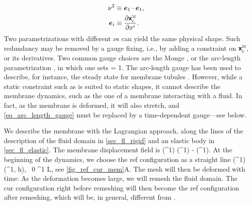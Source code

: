 \begin{align}\label{eq_intro_nu}
    \nu ^ 2   & \equiv \bevec{1}   \cdot \bevec{1}, \\
    \label{eq_def_e}
    \bevec{i} & \equiv \pder{{\bxmemc}}{\xcoord^i}.
\end{align}
Two  parametrizations with different $\nu$s can yield the same physical shape. Such  redundancy  may be removed by a gauge fixing, i.e., by adding a constraint on $\bxmemc$, or its derivatives.
Two common gauge choices are the Monge  \cite{hsiungFirstCourseDifferential1981,desernoFluidLipidMembranes2015}, or the arc-length parametrization \cite{derenyiFormationInteractionMembrane2002}, in which one sets
\be
\label{eq_arc_length_gauge}
\nu = 1.
\ee
The arc-length gauge has been used to describe, for instance, the steady state for membrane tubules \cite{derenyiFormationInteractionMembrane2002}. However, while a static constraint such as  is suited to  static shapes, it cannot describe the  membrane dynamics, such as the one of a membrane interacting with a fluid. In fact, as the membrane is deformed, it will also stretch, and \cref{eq_arc_length_gauge} must be replaced by a time-dependent  gauge---see below.

We describe the membrane with the Lagrangian approach, along the lines of the description of the fluid domain in \cref{sec_fl_rigid} and an elastic body  in \cref{sec_fl_elastic}.  The membrane displacement field is
\be\label{eq_u_mem}
\bumem(\xcoord^1) \equiv \bxmemc(\xcoord^1) - \bxmemr(\xcoord^1).
\ee
At the beginning of the dynamics, we choose the \ac{ref} configuration as a straight line
\be
\label{eq_def_x_ref}
\bxmemr(\xcoord^1) \equiv (\xcoord^1, h), \, 0 \leq  \xcoord^1 \leq L,
\ee
see \cref{fig_ref_cur_mem}A.
The mesh will then be deformed with time: As the deformation becomes large, we will remesh the fluid domain. The \ac{cur} configuration right before remeshing will then become the \ac{ref} configuration after remeshing, which will be, in general,  different from .
%


